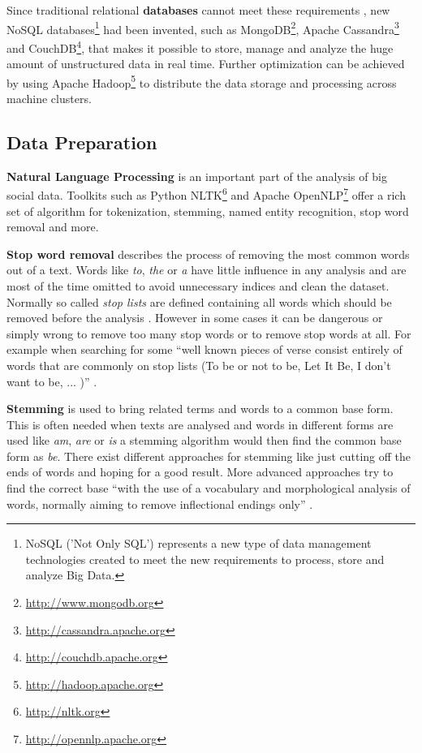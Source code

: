 Since traditional relational \textbf{databases} cannot meet these requirements \cite{TwitterDataAnalytics2013}, new NoSQL databases\footnote{NoSQL ('Not Only SQL') represents a new type of data management technologies created to meet the new requirements to process, store and analyze Big Data.} had been invented, such as MongoDB\footnote{\url{http://www.mongodb.org} \accessednote }, Apache Cassandra\footnote{\url{http://cassandra.apache.org} \accessednote} and CouchDB\footnote{\url{http://couchdb.apache.org} \accessednote}, that makes it possible to store, manage and analyze the huge amount of unstructured data in real time. Further optimization can be achieved by using Apache Hadoop\footnote{\url{http://hadoop.apache.org} \accessednote} to distribute the data storage and processing across machine clusters.


\subsection{Data Preparation}
\label{subsec:data-preparation}
\textbf{Natural Language Processing} is an important part of the analysis of big social data. Toolkits such as Python NLTK\footnote{\url{http://nltk.org} \accessednote} and Apache OpenNLP\footnote{\url{http://opennlp.apache.org} \accessednote} offer a rich set of algorithm for tokenization, stemming, named entity recognition, stop word removal and more.

\textbf{Stop word removal} describes the process of removing the most common words out of a text. Words like \textit{to}, \textit{the} or \textit{a} have little influence in any analysis and are most of the time omitted to avoid unnecessary indices and clean the dataset. Normally so called \textit{stop lists} are defined containing all words which should be removed before the analysis \cite[27]{manning2008introduction}. However in some cases it can be dangerous or simply wrong to remove too many stop words or to remove stop words at all. For example when searching for some \enquote{well known pieces of verse consist entirely of words that are commonly on stop lists (To be or not to be, Let It Be, I don’t want to be, ... )} \cite[27]{manning2008introduction}.

\textbf{Stemming} is used to bring related terms and words to a common base form. This is often needed when texts are analysed and words in different forms are used like \textit{am}, \textit{are} or \textit{is} a stemming algorithm would then find the common base form as \textit{be}. There exist different approaches for stemming like just cutting off the ends of words and hoping for a good result. More advanced approaches try to find the correct base \enquote{with the use of a vocabulary and morphological analysis of words, normally aiming to remove inflectional endings only} \cite[32]{manning2008introduction}.

